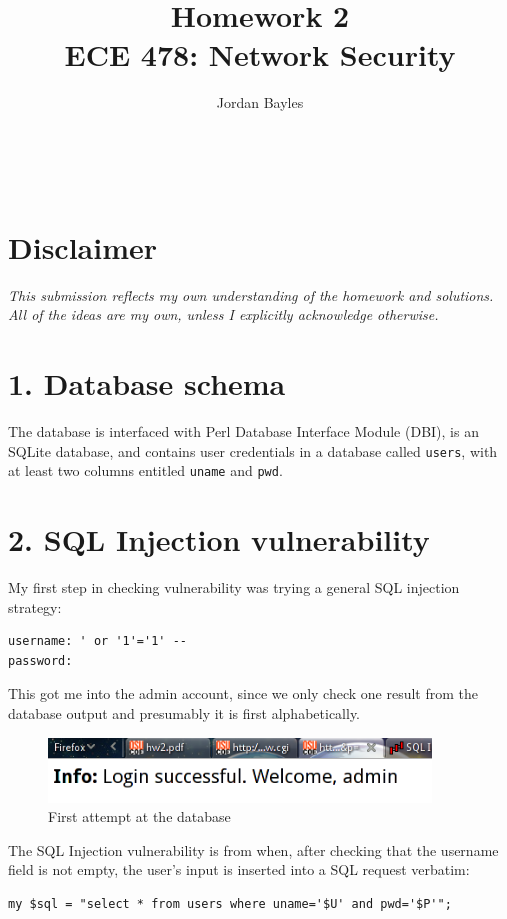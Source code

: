 \documentclass[12pt,letterpaper]{article}
\author{Jordan Bayles}
\title{Homework 2\\
\small ECE 478: Network Security}
\makeatletter
\let\thetitle\@title
\let\theauthor\@author
\let\thedate\@date
\makeatother
\begin{document}
\begin{flushright}
\theauthor\\
\thedate
\end{flushright}
\begin{center}
\thetitle
\end{center}

\section{Disclaimer}
\emph{This submission reflects my own understanding of the homework and
solutions. All of the ideas are my own, unless I explicitly acknowledge otherwise.}

\section*{1. Database schema}
The database is interfaced with Perl Database Interface Module (DBI), is an
SQLite database, and
contains user credentials in a database called \verb!users!, with at least
two columns entitled \verb!uname! and \verb!pwd!.

\section*{2. SQL Injection vulnerability}
My first step in checking vulnerability was trying a general SQL injection
strategy:

\begin{verbatim}
username: ' or '1'='1' --
password:
\end{verbatim}

This got me into the admin account, since we only check one result from the
database output and presumably it is first alphabetically.

\begin{figure}[H]
	\centering
	\includegraphics[width=4in]{attempt1.png}
	\caption{First attempt at the database}
\end{figure}

The SQL Injection vulnerability is from when, after checking that the
username field is not empty, the user's input is inserted into
a SQL request verbatim:

\begin{verbatim}
my $sql = "select * from users where uname='$U' and pwd='$P'";
\end{verbatim}
\end{document}
